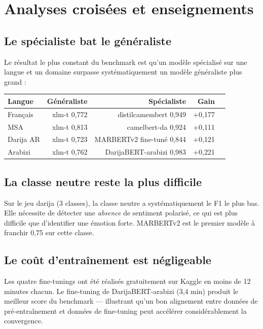 \documentclass[12pt, a4paper]{article}
\begin{document}
\section{Analyses croisées et enseignements}

\subsection{Le spécialiste bat le généraliste}

Le résultat le plus constant du benchmark est qu'un modèle spécialisé sur
une langue et un domaine surpasse systématiquement un modèle généraliste
plus grand :

\begin{center}
\begin{tabular}{lrrrr}
\toprule
\textbf{Langue} & \textbf{Généraliste} & \textbf{Spécialiste} & \textbf{Gain} \\
\midrule
Français     & xlm-t 0{,}772  & distilcamembert 0{,}949   & +0{,}177 \\
MSA          & xlm-t 0{,}813  & camelbert-da 0{,}924       & +0{,}111 \\
Darija AR    & xlm-t 0{,}723  & MARBERTv2 fine-tuné 0{,}844 & +0{,}121 \\
Arabizi      & xlm-t 0{,}762  & DarijaBERT-arabizi 0{,}983  & +0{,}221 \\
\bottomrule
\end{tabular}
\end{center}

\subsection{La classe neutre reste la plus difficile}

Sur le jeu darija (3 classes), la classe neutre a systématiquement le F1
le plus bas. Elle nécessite de détecter une \textit{absence} de sentiment
polarisé, ce qui est plus difficile que d'identifier une émotion forte.
MARBERTv2 est le premier modèle à franchir 0{,}75 sur cette classe.

\subsection{Le coût d'entraînement est négligeable}

Les quatre fine-tunings ont été réalisés gratuitement sur Kaggle en moins
de 12 minutes chacun. Le fine-tuning de DarijaBERT-arabizi (3,4 min) produit
le meilleur score du benchmark — illustrant qu'un bon alignement entre données
de pré-entraînement et données de fine-tuning peut accélérer considérablement
la convergence.
\end{document}
